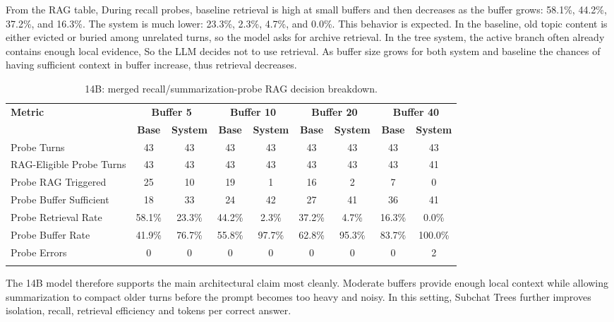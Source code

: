 \documentclass[pdflatex,sn-mathphys-num]{sn-jnl}%
\theoremstyle{thmstyleone}%
\theoremstyle{thmstyletwo}%
\theoremstyle{thmstylethree}%
\begin{document}
From the RAG table, During recall probes, baseline retrieval is high at small buffers and then decreases as the buffer grows: 58.1\%, 44.2\%, 37.2\%, and 16.3\%. The system is much lower: 23.3\%, 2.3\%, 4.7\%, and 0.0\%. This behavior is expected. In the baseline, old topic content is either evicted or buried among unrelated turns, so the model asks for archive retrieval. In the tree system, the active branch often already contains enough local evidence, So the LLM decides not to use retrieval. As buffer size grows for both system and baseline the chances of having sufficient context in buffer increase, thus retrieval decreases.

\begin{table}[htbp]
\caption{14B: merged recall/summarization-probe RAG decision breakdown.}\label{tab:14b_rag_main}
\centering
\tiny
\setlength{\tabcolsep}{2.2pt}
\begin{adjustbox}{width=\textwidth}
\begin{tabular}{lcccccccc}
\toprule
\textbf{Metric} & \multicolumn{2}{c}{\textbf{Buffer 5}} & \multicolumn{2}{c}{\textbf{Buffer 10}} & \multicolumn{2}{c}{\textbf{Buffer 20}} & \multicolumn{2}{c}{\textbf{Buffer 40}} \\
\cmidrule(lr){2-3}\cmidrule(lr){4-5}\cmidrule(lr){6-7}\cmidrule(lr){8-9}
 & \textbf{Base} & \textbf{System} & \textbf{Base} & \textbf{System} & \textbf{Base} & \textbf{System} & \textbf{Base} & \textbf{System} \\
\midrule
Probe Turns & 43 & 43 & 43 & 43 & 43 & 43 & 43 & 43 \\
RAG-Eligible Probe Turns & 43 & 43 & 43 & 43 & 43 & 43 & 43 & 41 \\
Probe RAG Triggered & 25 & 10 & 19 & 1 & 16 & 2 & 7 & 0 \\
Probe Buffer Sufficient & 18 & 33 & 24 & 42 & 27 & 41 & 36 & 41 \\
Probe Retrieval Rate & 58.1\% & 23.3\% & 44.2\% & 2.3\% & 37.2\% & 4.7\% & 16.3\% & 0.0\% \\
Probe Buffer Rate & 41.9\% & 76.7\% & 55.8\% & 97.7\% & 62.8\% & 95.3\% & 83.7\% & 100.0\% \\
Probe Errors & 0 & 0 & 0 & 0 & 0 & 0 & 0 & 2 \\
\botrule
\end{tabular}
\end{adjustbox}
\end{table}

The 14B model therefore supports the main architectural claim most cleanly. Moderate buffers provide enough local context while allowing summarization to compact older turns before the prompt becomes too heavy and noisy. In this setting, Subchat Trees further improves isolation, recall, retrieval efficiency and tokens per correct answer.
\end{document}
